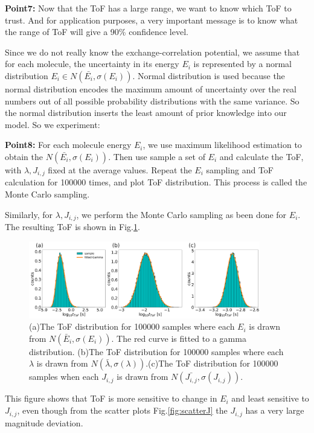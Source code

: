 \documentclass[letterpaper,12pt]{article}
\begin{document}
\textbf{Point7:} Now that the ToF has a large range, we want to know which ToF to trust.  And for application purposes, a very important message is to know what the range of ToF will give a 90\% confidence level. 

Since we do not really know the exchange-correlation potential, we assume that for each molecule, the uncertainty in its energy $E_i$ is represented by a normal distribution $E_i \in N(\bar{E_i},\sigma(E_i))$. Normal distribution is used because the normal distribution encodes the maximum amount of uncertainty over the real numbers out of all possible probability distributions with the same variance. 
So the normal distribution inserts the least amount of prior knowledge into our model. 
So we experiment: 

\textbf{Point8:} For each molecule energy $E_i$, we use maximum likelihood estimation to obtain the $N(\bar{E_i},\sigma(E_i))$. Then use sample a set of $E_i$ and calculate the ToF, with $\lambda,J_{i,j}$ fixed at the average values. 
Repeat the $E_i$ sampling and ToF calculation for 100000 times, and plot ToF distribution. This process is called the Monte Carlo sampling. 

Similarly, for $\lambda,J_{i,j}$, we perform the Monte Carlo sampling as been done for $E_i$. The resulting ToF is shown in Fig.\ref{fig:ToFs}.

\begin{figure}
    \centering
    \includegraphics[width=0.9\textwidth]{figs/fig_mle.png}
    \caption{(a)The ToF distribution for 100000 samples where each $E_i$ is drawn from $N(\bar{E}_i,\sigma(E_i))$. The red curve is fitted to a gamma distribution. (b)The ToF distribution for 100000 samples where each $\lambda$ is drawn from $N(\bar{\lambda},\sigma(\lambda))$.(c)The ToF distribution for 100000 samples when each $J_{i,j}$ is drawn from $N(\bar{J_{i,j}},\sigma(J_{i,j}))$.}
    \label{fig:ToFs}
\end{figure} 

This figure shows that ToF is more sensitive to change in $E_i$ and least sensitive to $J_{i,j}$, even though from the scatter plots Fig.\ref{fig:scatterJ} the $J_{i,j}$ has a very large magnitude deviation. 
\end{document}
